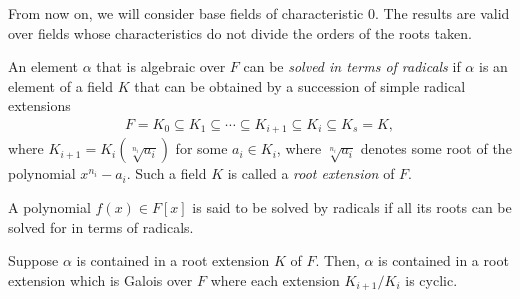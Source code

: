 \documentclass[10pt]{mypackage}
\begin{document}
From now on, we will consider base fields of characteristic $0$. The results are valid over fields whose characteristics do not divide the orders of the roots taken.
\begin{definition}
  An element $\alpha$ that is algebraic over $F$ can be \textit{solved in terms of radicals} if $\alpha$ is an element of a field $K$ that can be obtained by a succession of simple radical extensions
  \begin{align*}
    F = K_0\subseteq K_1\subseteq\cdots\subseteq K_{i+1}\subseteq K_i\subseteq K_s = K,
  \end{align*}
  where $K_{i+1} = K_i\left( \sqrt[n_i]{a_i} \right)$ for some $a_i\in K_i$, where $\sqrt[n_i]{a_i}$ denotes some root of the polynomial $x^{n_i}-a_i$. Such a field $K$ is called a \textit{root extension} of $F$.

  A polynomial $f(x)\in F[x]$ is said to be solved by radicals if all its roots can be solved for in terms of radicals.
\end{definition}
\begin{lemma}
  Suppose $\alpha$ is contained in a root extension $K$ of $F$. Then, $\alpha$ is contained in a root extension which is Galois over $F$ where each extension $K_{i+1}/K_i$ is cyclic.
\end{lemma}
\end{document}
